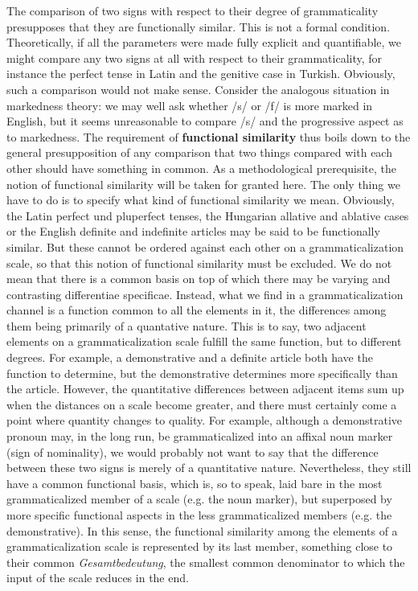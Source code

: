 The comparison of two signs with respect to their degree of grammaticality presupposes that they are functionally similar. This is not a formal condition. Theoretically, if all the parameters were made fully explicit and quantifiable, we might compare any two signs at all with respect to their grammaticality, for instance the perfect tense in Latin and the genitive case in Turkish. Obviously, such a comparison would not make sense. Consider the analogous situation in markedness theory: we may well ask whether /s/ or /f/ is more marked in English, but it seems unreasonable to compare /s/ and the progressive aspect as to markedness. The requirement of \textbf{functional similarity} thus boils down to the general presupposition of any comparison that two things compared with each other should have something in common. As a methodological prerequisite, the notion of functional similarity will be taken for granted here. The only thing we have to do is to specify what kind of functional similarity we mean. Obviously, the Latin perfect und pluperfect tenses, the Hungarian allative and ablative cases or the English definite and indefinite articles may be said to be functionally similar. But these cannot be ordered against each other on a grammaticalization scale, so that this notion of functional similarity must be excluded. We do not mean that there is a common basis on top of which there may be varying and contrasting differentiae specificae. Instead, what we find in a grammaticalization channel is a function common to all the elements in it, the differences among them being primarily of a quantative nature. This is to say, two adjacent elements on a grammaticalization scale fulfill the same function, but to different degrees. For example, a demonstrative and a definite article both have the function to determine, but the demonstrative determines more specifically than the article. However, the quantitative differences between adjacent items sum up when the distances on a scale become greater, and there must certainly come a point where quantity changes to quality. For example, although a demonstrative pronoun may, in the long run, be grammaticalized into an affixal noun marker (sign of nominality), we would probably not want to say that the difference between these two signs is merely of a quantitative nature. Nevertheless, they still have a common functional basis, which is, so to speak, laid bare in the most grammaticalized member of a scale (e.g. the noun marker), but superposed by more specific functional aspects in the less grammaticalized members (e.g. the demonstrative). In this sense, the functional similarity among the elements of a grammaticalization scale is represented by its last member, something close to their common \textit{Gesamtbedeutung}, the smallest common denominator to which the input of the scale reduces in the end.

